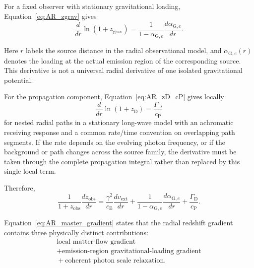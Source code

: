 For a fixed observer with stationary gravitational loading,
Equation~\eqref{eq:AR_zgrav} gives
\begin{equation}
    \frac{
        d
    }{
        dr
    }
    \ln(1+z_{\mathrm{grav}})
    =
    \frac{1}{
        1-\alpha_{\mathrm G,e}
    }
    \frac{
        d\alpha_{\mathrm G,e}
    }{
        dr
    }.
\end{equation}

Here \(r\) labels the source distance in the radial observational model, and
\(\alpha_{\mathrm G,e}(r)\) denotes the loading at the actual emission region
of the corresponding source. This derivative is not a universal radial
derivative of one isolated gravitational potential.

For the propagation component,
Equation~\eqref{eq:AR_zD_cP} gives locally
\begin{equation}
    \frac{
        d
    }{
        dr
    }
    \ln(1+z_{\mathrm D})
    =
    \frac{
        \Gamma_{\mathrm D}
    }{
        c_{\mathrm P}
    }
\end{equation}
for nested radial paths in a stationary long-wave model with an achromatic
receiving response and a common rate/time convention on overlapping path
segments. If the rate depends on the evolving photon frequency, or if the
background or path changes across the source family, the derivative must be
taken through the complete propagation integral rather than replaced by this
single local term.

Therefore,
\begin{equation}
    \boxed{
    \frac{1}{
        1+z_{\mathrm{obs}}
    }
    \frac{
        dz_{\mathrm{obs}}
    }{
        dr
    }
    =
    \frac{
        \gamma^2
    }{
        c_{\mathrm E}
    }
    \frac{
        dv_{\mathrm{ext}}
    }{
        dr
    }
    +
    \frac{1}{
        1-\alpha_{\mathrm G,e}
    }
    \frac{
        d\alpha_{\mathrm G,e}
    }{
        dr
    }
    +
    \frac{
        \Gamma_{\mathrm D}
    }{
        c_{\mathrm P}
    }.
    }
    \label{eq:AR_master_gradient}
\end{equation}

Equation~\eqref{eq:AR_master_gradient} states that the radial redshift gradient
contains three physically distinct contributions:
\begin{equation}
    \boxed{
    \begin{gathered}
    \text{local matter-flow gradient}\\
    {}+\text{emission-region gravitational-loading gradient}\\
    {}+\text{coherent photon scale relaxation}.
    \end{gathered}
    }
\end{equation}

